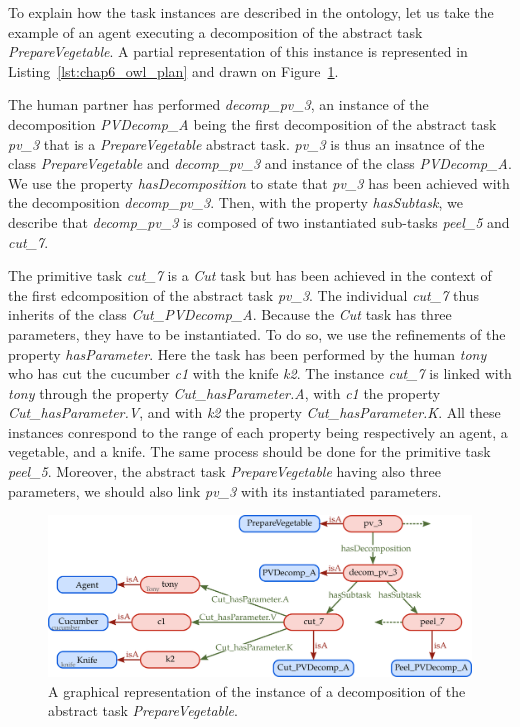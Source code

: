 To explain how the task instances are described in the ontology, let us take the example of an agent executing a decomposition of the abstract task \textit{PrepareVegetable}. A partial representation of this instance is represented in Listing~\ref{lst:chap6_owl_plan} and drawn on Figure~\ref{fig:chap6_abox}.

The human partner has performed \textit{decomp\_pv\_3}, an instance of the decomposition \textit{PVDecomp\_A} being the first decomposition of the abstract task \textit{pv\_3} that is a \textit{PrepareVegetable} abstract task. \textit{pv\_3} is thus an insatnce of the class \textit{PrepareVegetable} and \textit{decomp\_pv\_3} and instance of the class \textit{PVDecomp\_A}. We use the property \textit{hasDecomposition} to state that \textit{pv\_3} has been achieved with the decomposition \textit{decomp\_pv\_3}. Then, with the property \textit{hasSubtask}, we describe that \textit{decomp\_pv\_3} is composed of two instantiated sub-tasks \textit{peel\_5} and \textit{cut\_7}.

The primitive task \textit{cut\_7} is a \textit{Cut} task but has been achieved in the context of the first edcomposition of the abstract task \textit{pv\_3}. The individual \textit{cut\_7} thus inherits of the class  \textit{Cut\_PVDecomp\_A}. Because the \textit{Cut} task has three parameters, they have to be instantiated. To do so, we use the refinements of the property \textit{hasParameter}. Here the task has been performed by the human \textit{tony} who has cut the cucumber \textit{c1} with the knife \textit{k2}. The instance \textit{cut\_7} is linked with \textit{tony} through the property \textit{Cut\_hasParameter.A}, with \textit{c1} the property \textit{Cut\_hasParameter.V}, and with \textit{k2} the property \textit{Cut\_hasParameter.K}. All these instances conrespond to the range of each property being respectively an agent, a vegetable, and a knife. The same process should be done for the primitive task \textit{peel\_5}. Moreover, the abstract task \textit{PrepareVegetable} having also three parameters, we should also link \textit{pv\_3} with its instantiated parameters.

\begin{figure}[h!]
\centering
\includegraphics[width=\textwidth]{figures/chapter6/abox.png}
\caption{\label{fig:chap6_abox} A graphical representation of the instance of a decomposition of the abstract task \textit{PrepareVegetable}.}
\end{figure}

